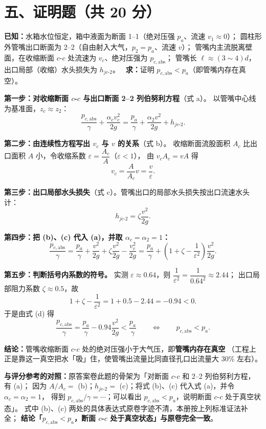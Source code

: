 \section{五、证明题（共 20 分）}


\begin{jie}
\textbf{已知：}水箱水位恒定，箱中液面为断面 1--1（绝对压强 $p_a$、流速 $v_1\approx0$）；
圆柱形外管嘴出口断面为 2--2（自由射入大气，$p_2=p_a$、流速 $v$）；
管嘴内主流脱离壁面，在收缩断面 $c$-$c$ 处流速为 $v_c$、绝对压强为 $p_{c,\mathrm{abs}}$；
管嘴长 $\ell\approx(3\sim4)d$，出口局部（收缩）水头损失为 $h_{jc\text{-}2}$。
\ \textbf{求：}证明 $p_{c,\mathrm{abs}}<p_a$（即管嘴内存在真空）。

\textbf{第一步：对收缩断面 $c$-$c$ 与出口断面 2--2 列伯努利方程}（式 a）。
以管嘴中心线为基准面，$z_c\approx z_2$：
\[
\frac{p_{c,\mathrm{abs}}}{\gamma}+\frac{\alpha_cv_c^{2}}{2g}
=\frac{p_a}{\gamma}+\frac{\alpha_2v^{2}}{2g}+h_{jc\text{-}2}. \tag{a}
\]

\textbf{第二步：由连续性方程写出 $v_c$ 与 $v$ 的关系}（式 b）。
收缩断面流股面积 $A_c$ 比出口面积 $A$ 小，令收缩系数 $\varepsilon=\dfrac{A_c}{A}$（$\varepsilon<1$），
由 $v_cA_c=vA$ 得
\[
v_c=\frac{A}{A_c}v=\frac{v}{\varepsilon}. \tag{b}
\]

\textbf{第三步：出口局部水头损失}（式 c）。管嘴出口的局部水头损失按出口流速水头计：
\[
h_{jc\text{-}2}=\zeta\frac{v^{2}}{2g}. \tag{c}
\]

\textbf{第四步：把 (b)、(c) 代入 (a)，并取 $\alpha_c=\alpha_2=1$：}
\[
\frac{p_{c,\mathrm{abs}}}{\gamma}=\frac{p_a}{\gamma}+\frac{v^{2}}{2g}
+\zeta\frac{v^{2}}{2g}-\frac{v_c^{2}}{2g}
=\frac{p_a}{\gamma}+\left(1+\zeta-\frac{1}{\varepsilon^{2}}\right)\frac{v^{2}}{2g}. \tag{d}
\]

\textbf{第五步：判断括号内系数的符号。}
实测 $\varepsilon\approx0.64$，则 $\dfrac{1}{\varepsilon^{2}}=\dfrac{1}{0.64^{2}}\approx2.44$；
出口局部阻力系数 $\zeta\approx0.5$，故
\[
1+\zeta-\frac{1}{\varepsilon^{2}}=1+0.5-2.44=-0.94<0 .
\]
于是由式 (d) 得
\[
\frac{p_{c,\mathrm{abs}}}{\gamma}=\frac{p_a}{\gamma}-0.94\frac{v^{2}}{2g}<\frac{p_a}{\gamma}
\qquad\Longleftrightarrow\qquad
p_{c,\mathrm{abs}}<p_a .
\]

\textbf{结论：}管嘴收缩断面 $c$-$c$ 处的绝对压强小于大气压，即\textbf{管嘴内存在真空}
（工程上正是靠这一真空把水「吸」住，使管嘴出流量比同直径孔口出流量大 30\% 左右）。
\end{jie}

\begin{tishi}
\textbf{与评分参考的对照：}原答案卷此题的骨架为「对断面 $c$-$c$ 和 2--2 列伯努利方程，有 (a)；
因为 $A/A_c=$ (b)；$h_{jc\text{-}2}=$ (c)；将式 (b)、(c) 代入式 (a)，并令 $\alpha_c=\alpha_2=1$，
得到 $p_{c,\mathrm{abs}}/\gamma=\cdots$；可以看出 $p_{c,\mathrm{abs}}<p_a$，说明断面 $c$-$c$ 处于真空状态」。
式中 (b)、(c) 两处的具体表达式原卷字迹不清，本册按上列标准证法补全；
\textbf{结论「$p_{c,\mathrm{abs}}<p_a$，断面 $c$-$c$ 处于真空状态」与原卷完全一致}。
\end{tishi}

